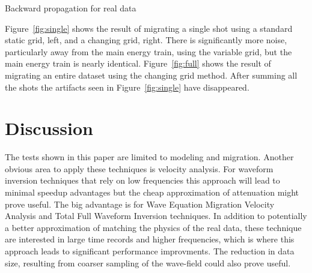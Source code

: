 \begin{algorithm} \caption{Backward propagation for real data}\label{alg:backward}
\begin{algorithmic}[1]
\ENDIF
\ENDFOR
\ENDFOR
 \end{algorithmic}
\end{algorithm}
Figure~\ref{fig:single} shows the result of migrating a single shot using a standard static grid, left, and a changing grid, right.  There is significantly
more noise, particularly away from the main energy train, using the variable grid, but the main energy train is nearly identical. Figure~\ref{fig:full}
shows the result of migrating an entire dataset using the changing grid method. After summing all the shots the artifacts seen in Figure~\ref{fig:single}
have disappeared.
\section{Discussion}
The tests shown in this paper are limited to modeling and migration. Another obvious area to apply
these techniques is velocity analysis. For waveform inversion techniques that rely on low frequencies this approach
will lead to minimal speedup advantages but the cheap approximation of attenuation might prove useful.
The big advantage is for  Wave Equation Migration Velocity Analysis\cite[]{Zhang.sep.152.yang1} and Total Full Waveform Inversion\cite[]{Almomin.sep.155.ali1} techniques.
In addition to potentially a better approximation of matching the physics of the real data, these technique
are interested in large time records and higher frequencies, which is where this approach leads to significant performance
improvments.  The reduction in data size,  resulting
from coarser sampling of the wave-field could also prove useful.


